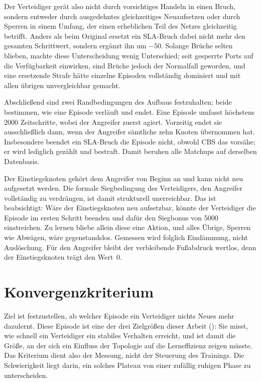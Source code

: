 Der Verteidiger gerät also nicht durch vorsichtiges Handeln in einen Bruch,
sondern entweder durch ausgedehntes gleichzeitiges Neuaufsetzen oder durch
Sperren in einem Umfang, der einen erheblichen Teil des Netzes gleichzeitig
betrifft. Anders als beim Original ersetzt ein \ac{SLA}-Bruch dabei nicht mehr
den gesamten Schrittwert, sondern ergänzt ihn um $-50$. Solange Brüche selten
blieben, machte diese Unterscheidung wenig Unterschied; seit gesperrte Ports
auf die Verfügbarkeit einwirken, sind Brüche jedoch der Normalfall geworden,
und eine ersetzende Strafe hätte einzelne Episoden vollständig dominiert und
mit allen übrigen unvergleichbar gemacht.

Abschließend sind zwei Randbedingungen des Aufbaus festzuhalten; beide bestimmen, wie
eine Episode verläuft und endet. Eine Episode umfasst höchstens \num{2000} Zeitschritte, wobei der Angreifer
zuerst agiert. Vorzeitig endet sie ausschließlich dann, wenn der Angreifer
sämtliche zehn Knoten übernommen hat. Insbesondere beendet ein
\ac{SLA}-Bruch die Episode nicht, obwohl \ac{CBS} das vorsähe; er wird lediglich
gezählt und bestraft. Damit beruhen alle Matchups auf derselben Datenbasis.

Der Einstiegsknoten gehört dem Angreifer von Beginn an und kann nicht neu
aufgesetzt werden. Die formale Siegbedingung des Verteidigers, den Angreifer
vollständig zu verdrängen, ist damit strukturell unerreichbar. Das ist
beabsichtigt: Wäre der Einstiegsknoten neu aufsetzbar, könnte der Verteidiger
die Episode im ersten Schritt beenden und dafür den Siegbonus von \num{5000}
einstreichen. Zu lernen bliebe allein diese eine Aktion, und alles Übrige,
Sperren wie Abwägen, wäre gegenstandslos. Gemessen wird folglich Eindämmung,
nicht Auslöschung. Für den Angreifer bleibt der verbleibende Fußabdruck
wertlos, denn der Einstiegsknoten trägt den Wert~0.

\section{Konvergenzkriterium}
\label{sec:konvergenz}

Ziel ist festzustellen, ab welcher Episode ein Verteidiger nichts Neues mehr
dazulernt. Diese Episode ist eine der drei Zielgrößen dieser Arbeit
(): Sie misst, wie schnell ein Verteidiger ein stabiles
Verhalten erreicht, und ist damit die Größe, an der sich ein Einfluss der
Topologie auf die Lerneffizienz zeigen müsste. Das Kriterium dient also der
Messung, nicht der Steuerung des Trainings. Die Schwierigkeit liegt darin, ein
solches Plateau von einer zufällig ruhigen Phase zu unterscheiden.

